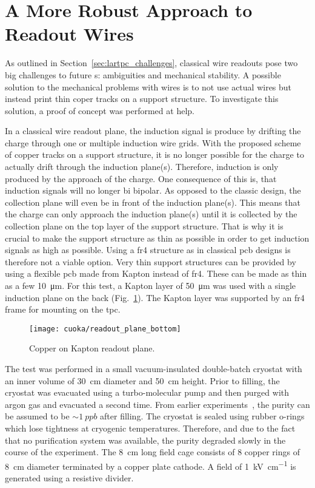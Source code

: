 \section{A More Robust Approach to  Readout Wires}
\label{sec:studies_cuoka}

As outlined in Section~\ref{sec:lartpc_challenges}, classical wire readouts pose two big challenges to future \lartpc{}s: ambiguities and mechanical stability.
A possible solution to the mechanical problems with wires is to not use actual wires but instead print thin coper tracks on a support structure.
To investigate this solution, a proof of concept was performed at \gls{help}.

In a classical wire readout plane, the induction signal is produce by drifting the charge through one or multiple induction wire grids.
With the proposed scheme of copper tracks on a support structure, it is no longer possible for the charge to actually drift through the induction plane(s).
Therefore, induction is only produced by the approach of the charge.
One consequence of this is, that induction signals will no longer bi bipolar.
As opposed to the classic design, the collection plane will even be in front of the induction plane(s).
This means that the charge can only approach the induction plane(s) until it is collected by the collection plane on the top layer of the support structure.
That is why it is crucial to make the support structure as thin as possible in order to get induction signals as high as possible.
Using a \gls{fr4} structure as in classical \gls{pcb} designs is therefore not a viable option.
Very thin support structures can be provided by using a flexible \gls{pcb} made from Kapton instead of \gls{fr4}.
These can be made as thin as a few \SI{10}{\micro\metre}.
For this test, a Kapton layer of \SI{50}{\micro\metre} was used with a single induction plane on the back (Fig.~\ref{fig:cuoka_readout-plane}).
The Kapton layer was supported by an \gls{fr4} frame for mounting on the \gls{tpc}.

\begin{figure}[htb]
	\centering
	\texttt{[image: cuoka/readout\_plane\_bottom]}
	\caption[Copper on Kapton readout plane]{%
		Copper on Kapton readout plane.
	}
	\label{fig:cuoka_readout-plane}
\end{figure}

The test was performed in a small vacuum-insulated double-batch cryostat with an inner volume of \SI{30}{\centi\metre} diameter and \SI{50}{\centi\metre} height.
Prior to filling, the cryostat was evacuated using a turbo-molecular pump and then purged with argon gas and evacuated a second time.
From earlier experiments~\cite{2photonAbs}, the purity can be assumed to be $\sim{\SI{1}{ppb}}$ after filling.
The cryostat is sealed using rubber o-rings which lose tightness at cryogenic temperatures.
Therefore, and due to the fact that no purification system was available, the purity degraded slowly in the course of the experiment.
The \SI{8}{\centi\metre} long field cage consists of \num{8} copper rings of \SI{8}{\centi\metre} diameter terminated by a copper plate cathode.
A field of \SI{1}{\kilo\volt\per\centi\metre} is generated using a resistive divider.

